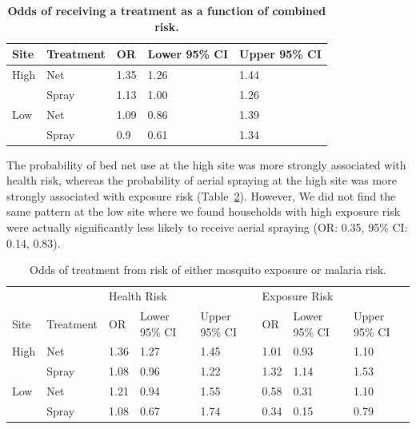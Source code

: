 \documentclass[10pt,letterpaper]{article}\usepackage[]{graphicx}\usepackage[]{color}
\begin{document}
{\begin{table}[!ht]
\begin{adjustwidth}{-2.25in}{0in} %
\centering
\caption{
{\bf Odds of receiving a treatment as a function of combined risk.} 
}
\begin{tabular}{lllll}
  \hline 
Site & Treatment & OR & Lower 95\% CI & Upper 95\% CI \\ 
  \hline
High & Net & 1.35 & 1.26 & 1.44 \\ 
   & Spray & 1.13 & 1.00 & 1.26 \\ 
  Low & Net & 1.09 & 0.86 & 1.39 \\ 
   & Spray & 0.9 & 0.61 & 1.34 \\ 
   \hline
\end{tabular}
\label{ORcmb}
\end{adjustwidth}
\end{table}

The probability of bed net use at the high site was more strongly associated with health risk,  whereas the probability of aerial spraying at the high site was more strongly associated with exposure risk (Table~\ref{ORtrt}).  However,  We did not find the same pattern at the low site where we found households with high exposure risk were actually significantly less likely to receive aerial spraying (OR: 0.35,  95\% CI: 0.14,  0.83).  \\






\begin{table}[!ht]
\caption{
{Odds of treatment from risk of either mosquito exposure or malaria risk.} 
}
\centering
\begin{tabular}{llllllll}
  \hline
 &  & \multicolumn{3}{l}{Health Risk} & \multicolumn{3}{l}{Exposure Risk}  \\ 
  
Site & Treatment & OR & Lower 95\% CI & Upper 95\% CI & OR & Lower 95\% CI & Upper 95\% CI \\ 
 \hline
  High & Net & 1.36 & 1.27 & 1.45 & 1.01 & 0.93 & 1.10 \\ 
   & Spray & 1.08 & 0.96 & 1.22 & 1.32 & 1.14 & 1.53 \\ 
  Low & Net & 1.21 & 0.94 & 1.55 & 0.58 & 0.31 & 1.10 \\ 
   & Spray & 1.08 & 0.67 & 1.74 & 0.34 & 0.15 & 0.79 \\ 
   \hline
\end{tabular}
\label{ORtrt}
\end{table}





















}
\end{document}
